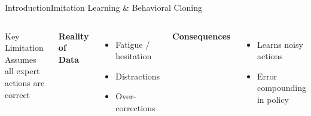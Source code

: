 \documentclass{beamer}
\begin{document}
\begin{frame}{Introduction}{Imitation Learning \& Behavioral Cloning}
\begin{columns}[T,onlytextwidth]
        \begin{alertblock}{Key Limitation}
            Assumes all expert actions are correct
        \end{alertblock}

        \vspace{0.5em}

        \textbf{Reality of Data}
        \begin{itemize}
            \item Fatigue / hesitation
            \item Distractions
            \item Over-corrections
        \end{itemize}

        \vspace{0.5em}

        \textbf{Consequences}
        \begin{itemize}
            \item Learns noisy actions
            \item Error compounding in policy
        \end{itemize}

    \end{columns}

\end{frame}
\end{document}
